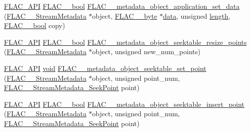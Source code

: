 \begin{DoxyCompactItemize}
\item 
\hyperlink{group__flac__export_ga56ca07df8a23310707732b1c0007d6f5}{F\+L\+A\+C\+\_\+\+A\+PI} \hyperlink{ordinals_8h_a95103469f1cbd78b8cf250194985b34e}{F\+L\+A\+C\+\_\+\+\_\+bool} \hyperlink{group__flac__metadata__object_ga8f7fbaa68d5637e2409a053ec2ff744d}{F\+L\+A\+C\+\_\+\+\_\+metadata\+\_\+object\+\_\+application\+\_\+set\+\_\+data} (\hyperlink{struct_f_l_a_c_____stream_metadata}{F\+L\+A\+C\+\_\+\+\_\+\+Stream\+Metadata} $\ast$object, \hyperlink{ordinals_8h_a5eb569b12d5b047cdacada4d57924ee3}{F\+L\+A\+C\+\_\+\+\_\+byte} $\ast$\hyperlink{lib_2expat_8h_ac39e72a1de1cb50dbdc54b08d0432a24}{data}, unsigned \hyperlink{test__lib_f_l_a_c_2format_8c_ac94dc16b22556ba5fa815655f27442da}{length}, \hyperlink{ordinals_8h_a95103469f1cbd78b8cf250194985b34e}{F\+L\+A\+C\+\_\+\+\_\+bool} copy)
\item 
\hyperlink{group__flac__export_ga56ca07df8a23310707732b1c0007d6f5}{F\+L\+A\+C\+\_\+\+A\+PI} \hyperlink{ordinals_8h_a95103469f1cbd78b8cf250194985b34e}{F\+L\+A\+C\+\_\+\+\_\+bool} \hyperlink{group__flac__metadata__object_ga836f94fa622ece4f50dadf27c7ec107a}{F\+L\+A\+C\+\_\+\+\_\+metadata\+\_\+object\+\_\+seektable\+\_\+resize\+\_\+points} (\hyperlink{struct_f_l_a_c_____stream_metadata}{F\+L\+A\+C\+\_\+\+\_\+\+Stream\+Metadata} $\ast$object, unsigned new\+\_\+num\+\_\+points)
\item 
\hyperlink{group__flac__export_ga56ca07df8a23310707732b1c0007d6f5}{F\+L\+A\+C\+\_\+\+A\+PI} \hyperlink{sound_8c_ae35f5844602719cf66324f4de2a658b3}{void} \hyperlink{group__flac__metadata__object_gae2c58ebdfb9f2b238d45971b14600944}{F\+L\+A\+C\+\_\+\+\_\+metadata\+\_\+object\+\_\+seektable\+\_\+set\+\_\+point} (\hyperlink{struct_f_l_a_c_____stream_metadata}{F\+L\+A\+C\+\_\+\+\_\+\+Stream\+Metadata} $\ast$object, unsigned point\+\_\+num, \hyperlink{struct_f_l_a_c_____stream_metadata___seek_point}{F\+L\+A\+C\+\_\+\+\_\+\+Stream\+Metadata\+\_\+\+Seek\+Point} point)
\item 
\hyperlink{group__flac__export_ga56ca07df8a23310707732b1c0007d6f5}{F\+L\+A\+C\+\_\+\+A\+PI} \hyperlink{ordinals_8h_a95103469f1cbd78b8cf250194985b34e}{F\+L\+A\+C\+\_\+\+\_\+bool} \hyperlink{group__flac__metadata__object_ga0c658260aaffb126486f5d1e211b53e5}{F\+L\+A\+C\+\_\+\+\_\+metadata\+\_\+object\+\_\+seektable\+\_\+insert\+\_\+point} (\hyperlink{struct_f_l_a_c_____stream_metadata}{F\+L\+A\+C\+\_\+\+\_\+\+Stream\+Metadata} $\ast$object, unsigned point\+\_\+num, \hyperlink{struct_f_l_a_c_____stream_metadata___seek_point}{F\+L\+A\+C\+\_\+\+\_\+\+Stream\+Metadata\+\_\+\+Seek\+Point} point)

\end{DoxyCompactItemize}
